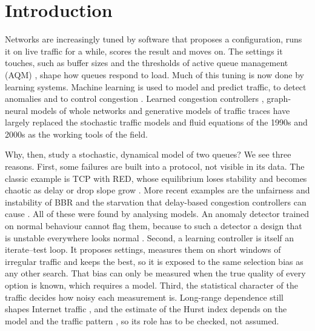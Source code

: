 \documentclass[11pt,a4paper]{article}
\begin{document}
\section{Introduction}
\label{sec:intro}

Networks are increasingly tuned by software that proposes a configuration, runs it on live traffic for a while, scores the result and moves on. The settings it touches, such as buffer sizes and the thresholds of active queue management (AQM) \citep{floyd1993random,nichols2012codel,pan2013pie}, shape how queues respond to load. Much of this tuning is now done by learning systems. Machine learning is used to model and predict traffic, to detect anomalies and to control congestion \citep{boutaba2018comprehensive,pang2021deep,huang2021machine}. Learned congestion controllers \citep{jay2019deep,abbasloo2020classic}, graph-neural models of whole networks \citep{rusek2020routenet} and generative models of traffic traces \citep{lin2020using,yin2022practical} have largely replaced the stochastic traffic models and fluid equations of the 1990s and 2000s as the working tools of the field.

Why, then, study a stochastic, dynamical model of two queues? We see three reasons. First, some failures are built into a protocol, not visible in its data. The classic example is TCP with RED, whose equilibrium loses stability and becomes chaotic as delay or drop slope grow \citep{ranjan2004nonlinear,low2002internet}. More recent examples are the unfairness and instability of BBR \citep{ware2019modeling,scherrer2022model} and the starvation that delay-based congestion controllers can cause \citep{arun2022starvation}. All of these were found by analysing models. An anomaly detector trained on normal behaviour cannot flag them, because to such a detector a design that is unstable everywhere looks normal \citep{sommer2010outside}. Second, a learning controller is itself an iterate--test loop. It proposes settings, measures them on short windows of irregular traffic and keeps the best, so it is exposed to the same selection bias as any other search. That bias can only be measured when the true quality of every option is known, which requires a model. Third, the statistical character of the traffic decides how noisy each measurement is. Long-range dependence still shapes Internet traffic \citep{fontugne2017scaling}, and the estimate of the Hurst index depends on the model and the traffic pattern \citep{dymora2020influence}, so its role has to be checked, not assumed.
\end{document}
